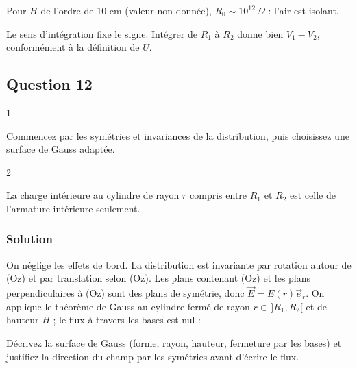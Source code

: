 \documentclass[11pt,a4paper]{article}
\newcommand{\equationajustee}[1]{%
  \sbox{\boiteequation}{$\displaystyle #1$}%
  \ifdim\wd\boiteequation>\linewidth
    \[\resizebox{\linewidth}{!}{\usebox{\boiteequation}}\]%
  \else
    \[#1\]%
  \fi}
\begin{document}
Pour \(H\) de l'ordre de 10 cm (valeur non donnée), \(R_0\sim10^{12}\ \Omega\) : l'air est isolant.

\begin{piege}

Le sens d'intégration fixe le signe. Intégrer de \(R_1\) à \(R_2\) donne bien \(V_1-V_2\), conformément à la définition de \(U\).

\end{piege}

\hypertarget{question-12}{%
\subsection{Question 12}\label{question-12}}

\begin{indication}{1}

Commencez par les symétries et invariances de la distribution, puis choisissez une surface de Gauss adaptée.

\end{indication}

\begin{indication}{2}

La charge intérieure au cylindre de rayon \(r\) compris entre \(R_1\) et \(R_2\) est celle de l'armature intérieure seulement.

\end{indication}

\hypertarget{solution-11}{%
\subsubsection{Solution}\label{solution-11}}

On néglige les effets de bord. La distribution est invariante par rotation autour de (Oz) et par translation selon (Oz). Les plans contenant (Oz) et les plans perpendiculaires à (Oz) sont des plans de symétrie, donc \(\vec E=E(r)\vec e_r\). On applique le théorème de Gauss au cylindre fermé de rayon \(r\in\,]R_1,R_2[\) et de hauteur \(H\) ; le flux à travers les bases est nul :

\equationajustee{E(r)\,2\pi rH=\frac Q{\varepsilon_0}}

\equationajustee{\boxed{\vec E=\frac{Q}{2\pi\varepsilon_0Hr}\vec e_r}}

\begin{jury}

Décrivez la surface de Gauss (forme, rayon, hauteur, fermeture par les bases) et justifiez la direction du champ par les symétries avant d'écrire le flux.

\end{jury}
\end{document}
